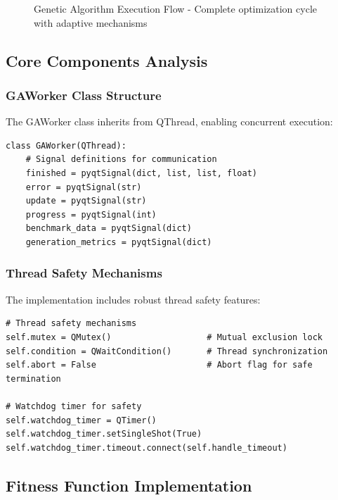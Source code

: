 \documentclass[12pt,a4paper]{article}
\begin{document}
\begin{figure}[H]
\caption{Genetic Algorithm Execution Flow - Complete optimization cycle with adaptive mechanisms}
\end{figure}

\subsection{Core Components Analysis}

\subsubsection{GAWorker Class Structure}
The GAWorker class inherits from QThread, enabling concurrent execution:

\begin{lstlisting}[caption=GAWorker Class Definition]
class GAWorker(QThread):
    # Signal definitions for communication
    finished = pyqtSignal(dict, list, list, float)
    error = pyqtSignal(str)
    update = pyqtSignal(str)
    progress = pyqtSignal(int)
    benchmark_data = pyqtSignal(dict)
    generation_metrics = pyqtSignal(dict)
\end{lstlisting}

\subsubsection{Thread Safety Mechanisms}
The implementation includes robust thread safety features:

\begin{lstlisting}[caption=Thread Safety Implementation]
# Thread safety mechanisms
self.mutex = QMutex()                   # Mutual exclusion lock
self.condition = QWaitCondition()       # Thread synchronization
self.abort = False                      # Abort flag for safe termination

# Watchdog timer for safety
self.watchdog_timer = QTimer()
self.watchdog_timer.setSingleShot(True)
self.watchdog_timer.timeout.connect(self.handle_timeout)
\end{lstlisting}

\subsection{Fitness Function Implementation}
\end{document}
